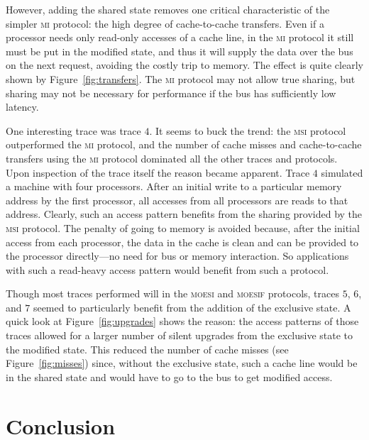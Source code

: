 \documentclass{article}
\newcommand\prot[1]{\textsc{#1}}
\newcommand\MI{\prot{mi}\xspace}
\newcommand\MSI{\prot{msi}\xspace}
\newcommand\MOESI{\prot{moesi}\xspace}
\newcommand\MOESIF{\prot{moesif}\xspace}
\begin{document}
  However, adding the shared state removes one critical characteristic
  of the simpler \MI protocol: the high degree of cache-to-cache
  transfers.  Even if a processor needs only read-only accesses of a
  cache line, in the \MI protocol it still must be put in the modified
  state, and thus it will supply the data over the bus on the next
  request, avoiding the costly trip to memory. The effect is quite
  clearly shown by Figure~\ref{fig:transfers}. The \MI protocol may
  not allow true sharing, but sharing may not be necessary for
  performance if the bus has sufficiently low latency.

  One interesting trace was trace $4$. It seems to buck the trend: the
  \MSI protocol outperformed the \MI protocol, and the number of cache
  misses and cache-to-cache transfers using the \MI protocol dominated
  all the other traces and protocols. Upon inspection of the trace
  itself the reason became apparent. Trace $4$ simulated a machine
  with four processors. After an initial write to a particular memory
  address by the first processor, all accesses from all processors are
  reads to that address. Clearly, such an access pattern benefits from
  the sharing provided by the \MSI protocol. The penalty of going to
  memory is avoided because, after the initial access from each
  processor, the data in the cache is clean and can be provided to the
  processor directly---no need for bus or memory interaction. So
  applications with such a read-heavy access pattern would benefit
  from such a protocol.

  Though most traces performed will in the \MOESI and \MOESIF
  protocols, traces $5$, $6$, and $7$ seemed to particularly benefit
  from the addition of the exclusive state. A quick look at
  Figure~\ref{fig:upgrades} shows the reason: the access patterns of
  those traces allowed for a larger number of silent upgrades from the
  exclusive state to the modified state. This reduced the number of
  cache misses (see Figure~\ref{fig:misses}) since, without the
  exclusive state, such a cache line would be in the shared state and
  would have to go to the bus to get modified access.


  \section{Conclusion}
  \label{sec:conclusion}
\end{document}
